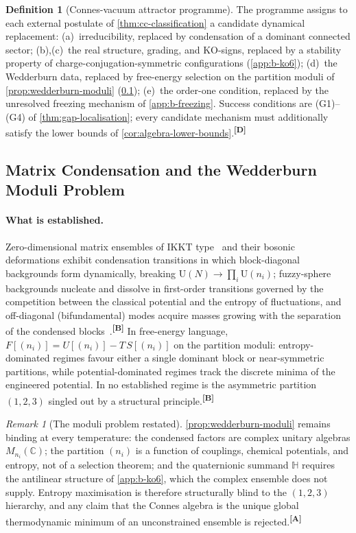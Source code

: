 \documentclass[12pt,a4paper,twoside]{article}
\theoremstyle{plain}
\theoremstyle{definition}
\newtheorem{definition}[theorem]{Definition}
\theoremstyle{remark}
\newtheorem{remark}[theorem]{Remark}
\newcommand{\catmark}[1]{\textsuperscript{\textsf{\textbf{[#1]}}}}
\begin{document}
\begin{definition}[Connes-vacuum attractor programme]
\label{def:attractor-programme}
The programme assigns to each external postulate of
\cref{thm:cc-classification} a candidate dynamical replacement:
(a)~irreducibility, replaced by condensation of a dominant connected
sector; (b),(c)~the real structure, grading, and KO-signs, replaced by a
stability property of charge-conjugation-symmetric configurations
(\cref{app:b-ko6}); (d)~the Wedderburn data, replaced by free-energy
selection on the partition moduli of \cref{prop:wedderburn-moduli}
(\cref{app:b-condensation}); (e)~the order-one condition, replaced by the
unresolved freezing mechanism of \cref{app:b-freezing}. Success conditions
are (G1)--(G4) of \cref{thm:gap-localisation}; every candidate mechanism
must additionally satisfy the lower bounds of
\cref{cor:algebra-lower-bounds}.\catmark{D}
\end{definition}

\subsection{Matrix Condensation and the Wedderburn Moduli Problem}
\label{app:b-condensation}

\paragraph{What is established.}
Zero-dimensional matrix ensembles of IKKT type~\cite{ikkt1997} and their
bosonic deformations exhibit condensation transitions in which
block-diagonal backgrounds form dynamically, breaking
$\mathrm{U}(N)\to\prod_i\mathrm{U}(n_i)$; fuzzy-sphere backgrounds
nucleate and dissolve in first-order transitions governed by the
competition between the classical potential and the entropy of
fluctuations, and off-diagonal (bifundamental) modes acquire masses
growing with the separation of the condensed
blocks~\cite{azuma2004,grosse2005,steinacker2010}.\catmark{B} In
free-energy language, $F[(n_i)]=U[(n_i)]-T\,S[(n_i)]$ on the partition
moduli: entropy-dominated regimes favour either a single dominant block or
near-symmetric partitions, while potential-dominated regimes track the
discrete minima of the engineered potential. In no established regime is
the asymmetric partition $(1,2,3)$ singled out by a structural
principle.\catmark{B}

\begin{remark}[The moduli problem restated]
\label{rem:b-moduli-restated}
\cref{prop:wedderburn-moduli} remains binding at every temperature: the
condensed factors are complex unitary algebras $M_{n_i}(\mathbb{C})$; the
partition $(n_i)$ is a function of couplings, chemical potentials, and
entropy, not of a selection theorem; and the quaternionic summand
$\mathbb{H}$ requires the antilinear structure of \cref{app:b-ko6}, which
the complex ensemble does not supply. Entropy maximisation is therefore
structurally blind to the $(1,2,3)$ hierarchy, and any claim that the
Connes algebra is the unique global thermodynamic minimum of an
unconstrained ensemble is rejected.\catmark{A}
\end{remark}
\end{document}
